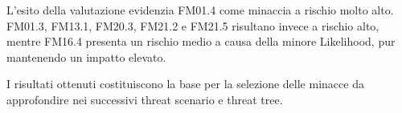L'esito della valutazione evidenzia FM01.4 come minaccia a rischio molto alto. FM01.3, FM13.1, FM20.3, FM21.2 e FM21.5 risultano invece a rischio alto, mentre FM16.4 presenta un rischio medio a causa della minore Likelihood, pur mantenendo un impatto elevato.

I risultati ottenuti costituiscono la base per la selezione delle minacce da approfondire nei successivi threat scenario e threat tree.